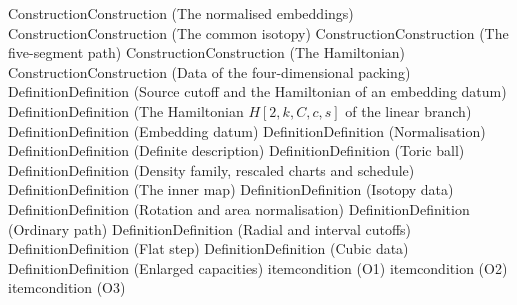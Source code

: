 \makeatletter
\newif\ifPoneXR \PoneXRfalse
\newcommand{\PoneDef}[3]{\expandafter\def\csname Pone@k@#1\endcsname{#2}\expandafter\def\csname Pone@n@#1\endcsname{#3}}
\DeclareRobustCommand{\PoneRef}[1]{\@ifundefined{Pone@k@#1}{\PackageError{p1refs}{Unknown Paper I label #1}{}}{%
  Paper~I, \ifPoneXR\csname Pone@k@#1\endcsname~\ref{P1-#1}\else\csname Pone@n@#1\endcsname\fi}}
\DeclareRobustCommand{\PoneTag}[1]{\@ifundefined{Pone@k@#1}{\PackageError{p1refs}{Unknown Paper I label #1}{}}{%
  Paper~I\ifPoneXR, \csname Pone@k@#1\endcsname~\ref{P1-#1}\fi}}
\makeatother
\PoneDef{cons:ham-branch}{Construction}{Construction (The normalised embeddings)}
\PoneDef{cons:iso-isotopy}{Construction}{Construction (The common isotopy)}
\PoneDef{cons:pln-five-segment}{Construction}{Construction (The five-segment path)}
\PoneDef{cons:pln-hamiltonian}{Construction}{Construction (The Hamiltonian)}
\PoneDef{cons:rtc-data}{Construction}{Construction (Data of the four-dimensional packing)}
\PoneDef{def:ham-H}{Definition}{Definition (Source cutoff and the Hamiltonian of an embedding datum)}
\PoneDef{def:ham-H-final}{Definition}{Definition (The Hamiltonian $H{[2,k,C,c,s]}$ of the linear branch)}
\PoneDef{def:ham-datum}{Definition}{Definition (Embedding datum)}
\PoneDef{def:ham-normalise}{Definition}{Definition (Normalisation)}
\PoneDef{def:intro-the}{Definition}{Definition (Definite description)}
\PoneDef{def:mech-toric-ball}{Definition}{Definition (Toric ball)}
\PoneDef{def:pln-charts}{Definition}{Definition (Density family, rescaled charts and schedule)}
\PoneDef{def:pln-inner-map}{Definition}{Definition (The inner map)}
\PoneDef{def:pln-isotopy-data}{Definition}{Definition (Isotopy data)}
\PoneDef{def:pln-normalisations}{Definition}{Definition (Rotation and area normalisation)}
\PoneDef{def:pln-ordinary-path}{Definition}{Definition (Ordinary path)}
\PoneDef{def:pre-cutoff}{Definition}{Definition (Radial and interval cutoffs)}
\PoneDef{def:pre-flat}{Definition}{Definition (Flat step)}
\PoneDef{def:shd4-data}{Definition}{Definition (Cubic data)}
\PoneDef{def:str-enlarged}{Definition}{Definition (Enlarged capacities)}
\PoneDef{it:pln-O1}{item}{condition (O1)}
\PoneDef{it:pln-O2}{item}{condition (O2)}
\PoneDef{it:pln-O3}{item}{condition (O3)}
